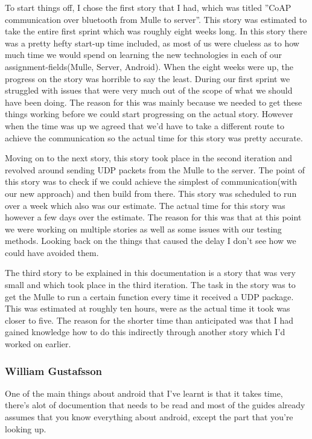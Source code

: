 To start things off, I chose the first story that I had, which was titled ''CoAP communication over bluetooth from Mulle to server''.
This story was estimated to take the entire first sprint which was roughly eight weeks long. In this story there was a pretty hefty start-up time included, 
as most of us were clueless as to how much time we would spend on learning the new technologies in each of our assignment-fields(Mulle, Server, Android).
When the eight weeks were up, the progress on the story was horrible to say the least. During our first sprint we struggled with issues that were very much 
out of the scope of what we should have been doing. The reason for this was mainly because we needed to get these things working before we could start progressing on the actual story.
However when the time was up we agreed that we'd have to take a different route to achieve the communication so the actual time for this story was pretty accurate.

Moving on to the next story, this story took place in the second iteration and revolved around sending UDP packets from the Mulle to the server.
The point of this story was to check if we could achieve the simplest of communication(with our new approach) and then build from there. This story was scheduled to run over 
a week  which also was our estimate. The actual time for this story was however a few days over the estimate. The reason for this was that at this point we were working on multiple stories as
well as some issues with our testing methods. Looking back on the things that caused the delay I don't see how we could have avoided them.

The third story to be explained in this documentation is a story that was very small and which took place in the third iteration.
The task in the story was to get the Mulle to run a certain function every time it received a UDP package. This was estimated at roughly ten hours, 
were as the actual time it took was closer to five. The reason for the shorter time than anticipated was that I had gained knowledge how to do this 
indirectly through another story which I'd worked on earlier.

\subsubsection{William Gustafsson}
One of the main things about android that I've learnt is that it takes time, 
there's alot of documention that needs to be read and most of the guides already assumes that you know everything about android, except the part that you're looking up.

